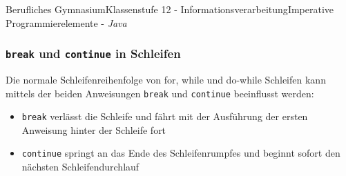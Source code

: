 \documentclass[oneside,openany,headings=optiontotoc,11pt,numbers=noenddot]{article}
\begin{document}
\begin{worksheet}{Berufliches Gymnasium}{Klassenstufe 12 - Informationsverarbeitung}{Imperative Programmierelemente - \textit{Java}}
		\subsubsection{{\lstinline[style=JavaInputStyle]|break|} und {\lstinline[style=JavaInputStyle]|continue|} in Schleifen}
		Die normale Schleifenreihenfolge von for, while und do-while Schleifen kann mittels der beiden Anweisungen \lstinline[style=JavaInputStyle]|break| und \lstinline[style=JavaInputStyle]|continue| beeinflusst werden:
		\begin{itemize}
			\item {\lstinline[style=JavaInputStyle]|break|} verlässt die Schleife und fährt mit der Ausführung der ersten Anweisung hinter der Schleife fort
			\item {\lstinline[style=JavaInputStyle]|continue|} springt an das Ende des Schleifenrumpfes und beginnt sofort den nächsten Schleifendurchlauf
		\end{itemize}

\end{worksheet}
\end{document}
